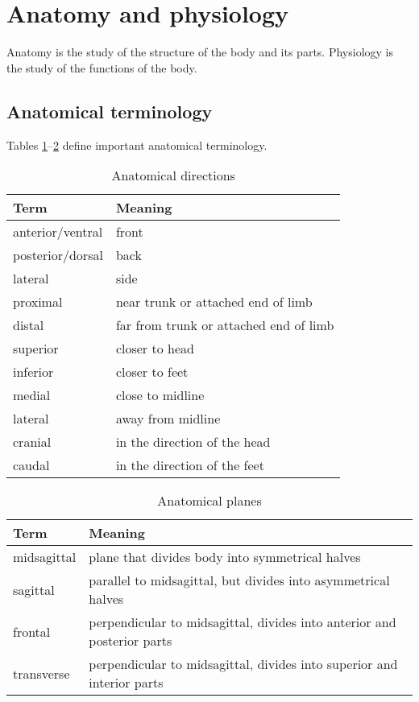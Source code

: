 \section{Anatomy and physiology}
Anatomy is the study of the structure of the body and its parts. Physiology is the study of the functions of the body.

\subsection{Anatomical terminology}
Tables \ref{tab:anatomical-directions}--\ref{tab:anatomical-planes} define important anatomical terminology.

\begin{table}[htbp]
    \centering
    \begin{tabularx}{\linewidth}{lX}
        \toprule
        Term & Meaning \\
        \midrule
        anterior/ventral & front \\
        posterior/dorsal & back \\
        lateral & side \\
        proximal & near trunk or attached end of limb \\
        distal & far from trunk or attached end of limb \\
        superior & closer to head \\
        inferior & closer to feet \\
        medial & close to midline \\
        lateral & away from midline \\
        cranial & in the direction of the head \\
        caudal & in the direction of the feet \\
        \bottomrule
    \end{tabularx}
    \caption{Anatomical directions}
    \label{tab:anatomical-directions}
\end{table}

\begin{table}[htbp]
    \centering
    \begin{tabularx}{\linewidth}{lX}
        \toprule
        Term & Meaning \\
        \midrule
        midsagittal & plane that divides body into symmetrical halves \\
        sagittal & parallel to midsagittal, but divides into asymmetrical halves \\
        frontal & perpendicular to midsagittal, divides into anterior and posterior parts \\
        transverse & perpendicular to midsagittal, divides into superior and interior parts \\
        \bottomrule
    \end{tabularx}
    \caption{Anatomical planes}
    \label{tab:anatomical-planes}
\end{table}

